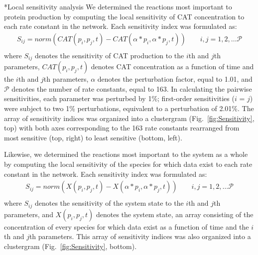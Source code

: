 \documentclass[12pt]{article}
\makeatletter
\renewcommand\subsection{\@startsection
	{subsection}{2}{0mm}
	{-0.05in}
	{-0.5\baselineskip}
	{\normalfont\normalsize\bfseries}}
\makeatother
\begin{document}
\subsection*{Local sensitivity analysis}
We determined the reactions most important to protein production by computing the local sensitivity of CAT concentration to each rate constant in the network.
Each sensitivity index was formulated as:
\begin{equation}\label{eqn:CAT-sensitivity}
\begin{split}
    S_{ij}=norm(CAT(p_i,p_j,t)-CAT(\alpha*p_i,\alpha*p_j,t))\qquad{i,j=1,2,\hdots\mathcal{P}}\\
\end{split}
\end{equation}
where $S_{ij}$ denotes the sensitivity of CAT production to the $i$th and $j$th parameters, $CAT(p_i,p_j,t)$ denotes CAT concentration as a function of time and the $i$th and $j$th parameters, $\alpha$ denotes the perturbation factor, equal to 1.01, and $\mathcal{P}$ denotes the number of rate constants, equal to 163.
In calculating the pairwise sensitivities, each parameter was perturbed by 1\%; first-order sensitivities ($i$ = $j$) were subject to two 1\% perturbations, equivalent to a perturbation of 2.01\%.
The array of sensitivity indices was organized into a clustergram (Fig.~\ref{fig:Sensitivity}, top) with both axes corresponding to the 163 rate constants rearranged from most sensitive (top, right) to least sensitive (bottom, left).

Likewise, we determined the reactions most important to the system as a whole by computing the local sensitivity of the species for which data exist to each rate constant in the network.
Each sensitivity index was formulated as:
\begin{equation}\label{eqn:system-sensitivity}
\begin{split}
    S_{ij}=norm(X(p_i,p_j,t)-X(\alpha*p_i,\alpha*p_j,t))\qquad{i,j=1,2,\hdots\mathcal{P}}\\
\end{split}
\end{equation}
where $S_{ij}$ denotes the sensitivity of the system state to the $i$th and $j$th parameters, and $X(p_i,p_j,t)$ denotes the system state, an array consisting of the concentration of every species for which data exist as a function of time and the $i$th and $j$th parameters.
This array of sensitivity indices was also organized into a clustergram (Fig.~\ref{fig:Sensitivity}, bottom).
\end{document}
